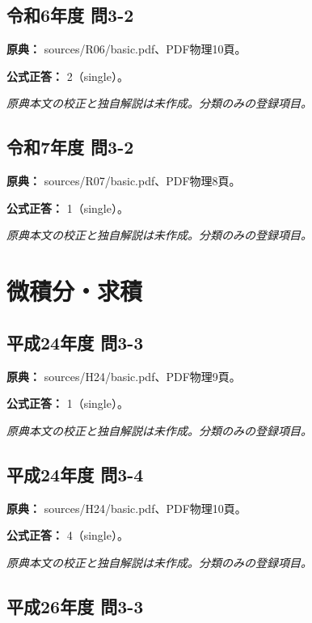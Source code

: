 \subsection{令和6年度 問3-2}
\label{q:r06-reg-basic-3-2}

\noindent\textbf{原典：} sources/R06/basic.pdf、PDF物理10頁。

\textbf{公式正答：} 2（single）。

\par\textit{原典本文の校正と独自解説は未作成。分類のみの登録項目。}

\subsection{令和7年度 問3-2}
\label{q:r07-reg-basic-3-2}

\noindent\textbf{原典：} sources/R07/basic.pdf、PDF物理8頁。

\textbf{公式正答：} 1（single）。

\par\textit{原典本文の校正と独自解説は未作成。分類のみの登録項目。}

\section{微積分・求積}

\subsection{平成24年度 問3-3}
\label{q:h24-reg-basic-3-3}

\noindent\textbf{原典：} sources/H24/basic.pdf、PDF物理9頁。

\textbf{公式正答：} 1（single）。

\par\textit{原典本文の校正と独自解説は未作成。分類のみの登録項目。}

\subsection{平成24年度 問3-4}
\label{q:h24-reg-basic-3-4}

\noindent\textbf{原典：} sources/H24/basic.pdf、PDF物理10頁。

\textbf{公式正答：} 4（single）。

\par\textit{原典本文の校正と独自解説は未作成。分類のみの登録項目。}

\subsection{平成26年度 問3-3}
\label{q:h26-reg-basic-3-3}


